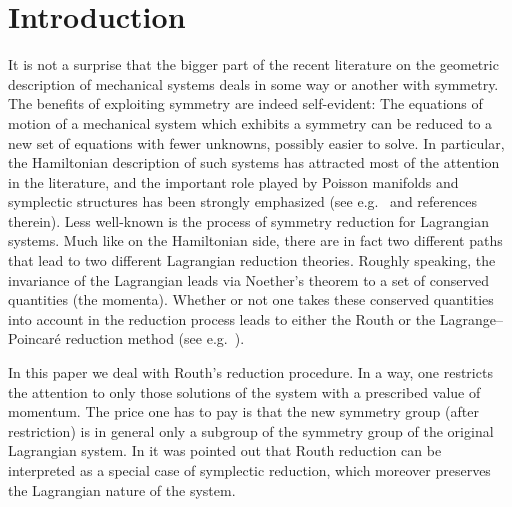 \documentclass[pdftex]{sigma}
\begin{document}
{\small

\tableofcontents

}

\section{Introduction}


It is not a surprise that the bigger part of the recent literature on the geometric description of mechanical systems deals in some way or another with symmetry.
The benef\/its of exploiting symmetry are indeed self-evident: The equations of motion of a mechanical system which exhibits a symmetry  can be reduced to a new set of
equations with fewer unknowns, possibly easier to solve. In particular, the Hamiltonian description of such systems has attracted most of the attention in the literature, and the important role played by Poisson manifolds and symplectic
structures has been strongly emphasized (see e.g.~\cite{MarsdenHamRed} and references therein). Less well-known is the process of
symmetry reduction for Lagrangian systems. Much like on the Hamiltonian side, there are in fact
two dif\/ferent paths that lead to two dif\/ferent Lagrangian reduction
theories.  Roughly speaking, the
invariance of the Lagrangian leads via Noether's theorem to a set
of conserved quantities (the momenta). Whether or not one takes these conserved quantities into account in the reduction
process leads to either the Routh or the Lagrange--Poincar\'e
reduction method (see e.g.~\cite{CMR01,survey,mestcram,BC,marsdenrouth,MCPaper}).

In this paper we deal with Routh's reduction procedure. In a way, one restricts the attention to only those solutions of the system with a prescribed value of momentum. The price one has to pay is that
the new symmetry group (after restriction) is in general only a subgroup of the symmetry
group of the original Lagrangian system. In \cite{BC} it was pointed out that  Routh reduction can be interpreted as a special case of symplectic reduction, which moreover preserves the Lagrangian nature of
the system.
\end{document}
